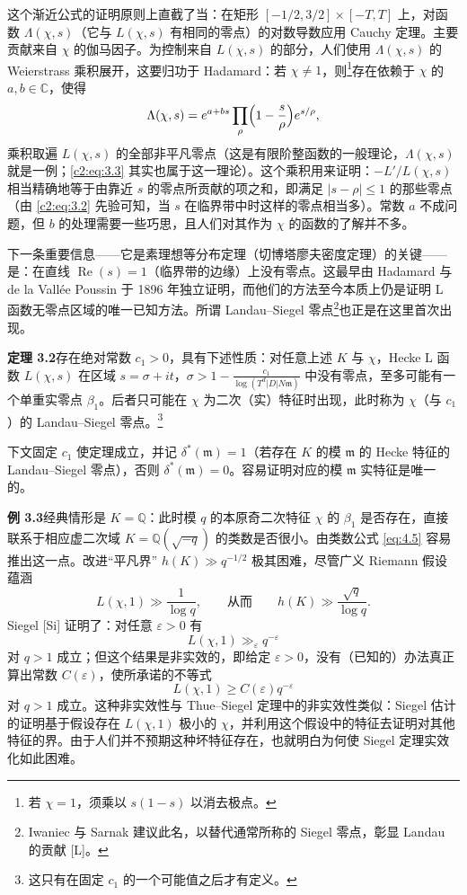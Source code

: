 这个渐近公式的证明原则上直截了当：在矩形 $[-1/2,3/2]\times[-T,T]$ 上，对函数 $\Lambda(\chi,s)$（它与 $L(\chi,s)$ 有相同的零点）的对数导数应用 Cauchy 定理。主要贡献来自 $\chi$ 的伽马因子。为控制来自 $L(\chi,s)$ 的部分，人们使用 $\Lambda(\chi,s)$ 的 Weierstrass 乘积展开，这要归功于 Hadamard：若 $\chi\neq1$，则\footnote{若 $\chi=1$，须乘以 $s(1-s)$ 以消去极点。}存在依赖于 $\chi$ 的 $a,b\in\mathbb{C}$，使得
\[
\Lambda(\chi,s)=e^{a+bs}\prod_\rho\Bigl(1-\frac{s}{\rho}\Bigr)e^{s/\rho},
\]
乘积取遍 $L(\chi,s)$ 的全部非平凡零点（这是有限阶整函数的一般理论，$\Lambda(\chi,s)$ 就是一例；\eqref{c2:eq:3.3} 其实也属于这一理论）。这个乘积用来证明：$-L'/L(\chi,s)$ 相当精确地等于由靠近 $s$ 的零点所贡献的项之和，即满足 $|s-\rho|\le1$ 的那些零点（由 \eqref{c2:eq:3.2} 先验可知，当 $s$ 在临界带中时这样的零点相当多）。常数 $a$ 不成问题，但 $b$ 的处理需要一些巧思，且人们对其作为 $\chi$ 的函数的了解并不多。

下一条重要信息——它是素理想等分布定理（切博塔廖夫密度定理）的关键——是：在直线 $\operatorname{Re}(s)=1$（临界带的边缘）上没有零点。这最早由 Hadamard 与 de la Vallée Poussin 于 1896 年独立证明，而他们的方法至今本质上仍是证明 L 函数无零点区域的唯一已知方法。所谓 Landau--Siegel 零点\footnote{Iwaniec 与 Sarnak 建议此名，以替代通常所称的 Siegel 零点，彰显 Landau 的贡献 [L]。}也正是在这里首次出现。

\par\medskip\noindent\textbf{定理 3.2}\quad 存在绝对常数 $c_1>0$，具有下述性质：对任意上述 $K$ 与 $\chi$，Hecke L 函数 $L(\chi,s)$ 在区域 $s=\sigma+it$，$\sigma>1-\frac{c_1}{\log(T^d|D|N\mathfrak{m})}$ 中没有零点，至多可能有一个单重实零点 $\beta_1$。后者只可能在 $\chi$ 为二次（实）特征时出现，此时称为 $\chi$（与 $c_1$）的 Landau--Siegel 零点。\footnote{这只有在固定 $c_1$ 的一个可能值之后才有定义。}

下文固定 $c_1$ 使定理成立，并记 $\delta^*(\mathfrak{m})=1$（若存在 $K$ 的模 $\mathfrak{m}$ 的 Hecke 特征的 Landau--Siegel 零点），否则 $\delta^*(\mathfrak{m})=0$。容易证明对应的模 $\mathfrak{m}$ 实特征是唯一的。

\par\medskip\noindent\textbf{例 3.3}\quad 经典情形是 $K=\mathbb{Q}$：此时模 $q$ 的本原奇二次特征 $\chi$ 的 $\beta_1$ 是否存在，直接联系于相应虚二次域 $K=\mathbb{Q}(\sqrt{-q})$ 的类数是否很小。由类数公式 \eqref{eq:4.5} 容易推出这一点。改进“平凡界” $h(K)\gg q^{-1/2}$ 极其困难，尽管广义 Riemann 假设蕴涵
\[
L(\chi,1)\gg\frac{1}{\log q},\qquad\text{从而}\qquad h(K)\gg\frac{\sqrt{q}}{\log q}.
\]
Siegel [Si] 证明了：对任意 $\varepsilon>0$ 有
\begin{equation}\tag{3.4}\label{c2:eq:3.4}
L(\chi,1)\gg_\varepsilon q^{-\varepsilon}
\end{equation}
对 $q>1$ 成立；但这个结果是非实效的，即给定 $\varepsilon>0$，没有（已知的）办法真正算出常数 $C(\varepsilon)$，使所承诺的不等式
\[
L(\chi,1)\ge C(\varepsilon)q^{-\varepsilon}
\]
对 $q>1$ 成立。这种非实效性与 Thue--Siegel 定理中的非实效性类似：Siegel 估计的证明基于假设存在 $L(\chi,1)$ 极小的 $\chi$，并利用这个假设中的特征去证明对其他特征的界。由于人们并不预期这种坏特征存在，也就明白为何使 Siegel 定理实效化如此困难。

